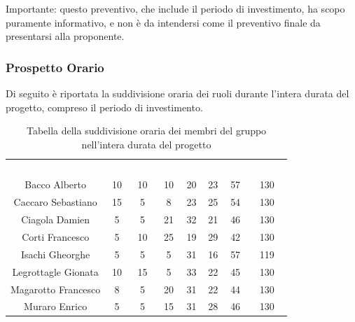 Importante: questo preventivo, che include il periodo di investimento, ha scopo puramente informativo, e non è da intendersi come il preventivo finale da presentarsi alla proponente.
\subsubsection{Prospetto Orario}
Di seguito è riportata la suddivisione oraria dei ruoli durante l'intera durata del progetto, compreso il periodo di investimento.




\begin{table}[H]	
	\begin{center}
	    \begin{tabular}{cccccccc}
			\rowcolor{greySWEight}
			\textcolor{white}{\textbf{Nome}} & \textcolor{white}{\textbf{Re}} & \textcolor{white}{\textbf{Am}} & \textcolor{white}{\textbf{An}} & \textcolor{white}{\textbf{Pj}} & \textcolor{white}{\textbf{Pr}} & \textcolor{white}{\textbf{Ve}} & \textcolor{white}{\textbf{Totale}}
			\\

			Bacco Alberto & 10 & 10 & 10 & 20 & 23 & 57 & 130 \\
			Caccaro Sebastiano & 15 & 5 & 8 & 23 & 25 & 54 & 130 \\
			Ciagola Damien & 5 & 5 & 21 & 32 & 21 & 46 & 130 \\
			Corti Francesco & 5 & 10 & 25 & 19 & 29 & 42 & 130 \\
			Isachi Gheorghe & 5 & 5 & 5 & 31 & 16 & 57 & 119 \\
			Legrottagle Gionata & 10 & 15 & 5 & 33 & 22 & 45 & 130 \\
			Magarotto Francesco & 8 & 5 & 20 & 31 & 22 & 44 & 130 \\
			Muraro Enrico & 5 & 5 & 15 & 31 & 28 & 46 & 130 \\
						\end{tabular}
	    \caption{Tabella della suddivisione oraria dei membri del gruppo nell'intera durata del progetto} \label{tab:tabellaProgInt} 
	\end{center}
\end{table}

